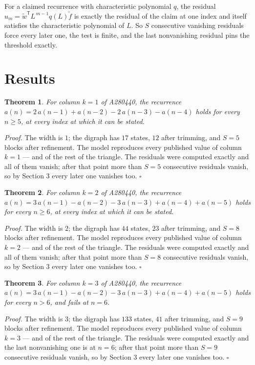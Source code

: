 \documentclass[11pt]{article}
\newtheorem{theorem}{Theorem}
\theoremstyle{definition}
\begin{document}
For a claimed recurrence with characteristic polynomial $q$, the residual $u_m = \tilde w^{\mathsf T}L^{\,m-1}q(L)\tilde f$ is exactly the residual of the claim at one index and itself satisfies the characteristic polynomial of $L$. So $S$ consecutive vanishing residuals force every later one, the test is finite, and the last nonvanishing residual pins the threshold exactly.

\section{Results}

\begin{theorem} For column $k = 1$ of A280440, the recurrence $a(n) = 2\,a(n-1) + a(n-2) - 2\,a(n-3) - a(n-4)$ holds for every $n \ge 5$, at every index at which it can be stated.\end{theorem}

{\itshape Proof.} The width is $1$; the digraph has $17$ states, $12$ after trimming, and $S = 5$ blocks after refinement. The model reproduces every published value of column $k = 1$ --- and of the rest of the triangle. The residuals were computed exactly and all of them vanish; after that point more than $S = 5$ consecutive residuals vanish, so by Section 3 every later one vanishes too. $\square$

\begin{theorem} For column $k = 2$ of A280440, the recurrence $a(n) = 3\,a(n-1) - a(n-2) - 3\,a(n-3) + a(n-4) + a(n-5)$ holds for every $n \ge 6$, at every index at which it can be stated.\end{theorem}

{\itshape Proof.} The width is $2$; the digraph has $44$ states, $23$ after trimming, and $S = 8$ blocks after refinement. The model reproduces every published value of column $k = 2$ --- and of the rest of the triangle. The residuals were computed exactly and all of them vanish; after that point more than $S = 8$ consecutive residuals vanish, so by Section 3 every later one vanishes too. $\square$

\begin{theorem} For column $k = 3$ of A280440, the recurrence $a(n) = 3\,a(n-1) - a(n-2) - 3\,a(n-3) + a(n-4) + a(n-5)$ holds for every $n > 6$, and fails at $n = 6$.\end{theorem}

{\itshape Proof.} The width is $3$; the digraph has $133$ states, $41$ after trimming, and $S = 9$ blocks after refinement. The model reproduces every published value of column $k = 3$ --- and of the rest of the triangle. The residuals were computed exactly and the last nonvanishing one is at $n = 6$; after that point more than $S = 9$ consecutive residuals vanish, so by Section 3 every later one vanishes too. $\square$
\end{document}
